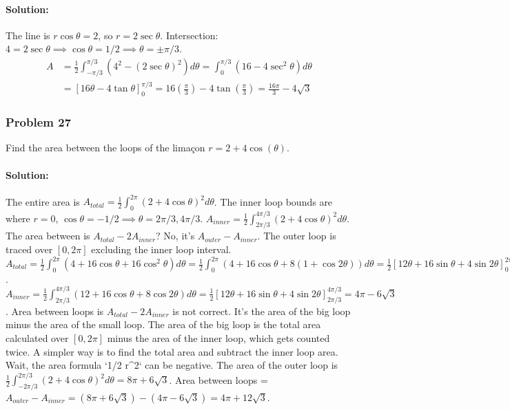 \documentclass{article}
\begin{document}
\paragraph{Solution:}
The line is $r\cos\theta = 2$, so $r = 2\sec\theta$. Intersection: $4=2\sec\theta \implies \cos\theta = 1/2 \implies \theta=\pm\pi/3$.
\begin{align*} A &= \frac{1}{2} \int_{-\pi/3}^{\pi/3} (4^2 - (2\sec\theta)^2) d\theta = \int_0^{\pi/3} (16 - 4\sec^2\theta) d\theta \\ &= [16\theta - 4\tan\theta]_0^{\pi/3} = 16(\frac{\pi}{3}) - 4\tan(\frac{\pi}{3}) = \frac{16\pi}{3} - 4\sqrt{3} \end{align*}

\subsubsection*{Problem 27}
Find the area between the loops of the limaçon $r = 2 + 4\cos(\theta)$.
\paragraph{Solution:}
The entire area is $A_{total} = \frac{1}{2}\int_0^{2\pi} (2+4\cos\theta)^2 d\theta$.
The inner loop bounds are where $r=0$, $\cos\theta=-1/2 \implies \theta=2\pi/3, 4\pi/3$.
$A_{inner} = \frac{1}{2}\int_{2\pi/3}^{4\pi/3} (2+4\cos\theta)^2 d\theta$.
The area between is $A_{total} - 2A_{inner}$? No, it's $A_{outer} - A_{inner}$. The outer loop is traced over $[0, 2\pi]$ excluding the inner loop interval.
$A_{total} = \frac{1}{2}\int_0^{2\pi} (4+16\cos\theta+16\cos^2\theta) d\theta = \frac{1}{2}\int_0^{2\pi}(4+16\cos\theta+8(1+\cos2\theta))d\theta = \frac{1}{2}[12\theta+16\sin\theta+4\sin2\theta]_0^{2\pi} = 12\pi$.
$A_{inner} = \frac{1}{2}\int_{2\pi/3}^{4\pi/3} (12+16\cos\theta+8\cos2\theta)d\theta = \frac{1}{2}[12\theta+16\sin\theta+4\sin2\theta]_{2\pi/3}^{4\pi/3} = 4\pi - 6\sqrt{3}$.
Area between loops is $A_{total} - 2A_{inner}$ is not correct. It's the area of the big loop minus the area of the small loop. The area of the big loop is the total area calculated over $[0, 2\pi]$ minus the area of the inner loop, which gets counted twice. A simpler way is to find the total area and subtract the inner loop area. Wait, the area formula `1/2 r^2` can be negative.
The area of the outer loop is $\frac{1}{2}\int_{-2\pi/3}^{2\pi/3} (2+4\cos\theta)^2 d\theta = 8\pi + 6\sqrt{3}$.
Area between loops = $A_{outer} - A_{inner} = (8\pi + 6\sqrt{3}) - (4\pi - 6\sqrt{3}) = 4\pi + 12\sqrt{3}$.
\end{document}
